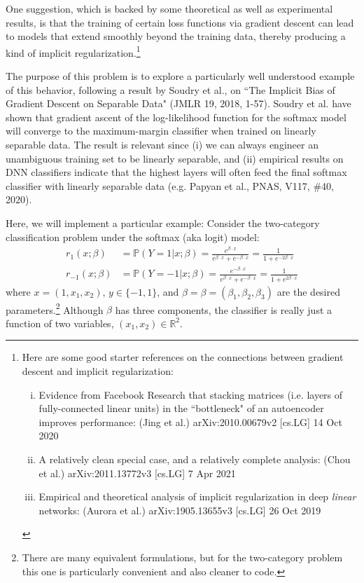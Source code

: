 \documentclass[11pt]{report}
\begin{document}
\begin{enumerate}[1.]
	      One suggestion, which is backed by some theoretical as well as experimental results, is that the training of certain loss functions via gradient descent can lead to models that extend smoothly beyond the training data, thereby producing a kind of implicit regularization.\footnote{
		      Here are some good starter references on the connections between gradient descent and implicit regularization:
		      \begin{enumerate}[(i)]
			      \item Evidence from Facebook Research that stacking matrices (i.e. layers of fully-connected linear units) in the ``bottleneck" of an autoencoder improves performance: (Jing et al.) arXiv:2010.00679v2 [cs.LG] 14 Oct 2020
			      \item A relatively clean special case, and a relatively complete analysis: (Chou et al.) arXiv:2011.13772v3 [cs.LG] 7 Apr 2021
			      \item
			            Empirical and theoretical analysis of implicit regularization in deep {\em linear} networks: (Aurora et al.) arXiv:1905.13655v3 [cs.LG]  26 Oct 2019
		      \end{enumerate}
	      }

	      The purpose of this problem is to explore a particularly well understood example of this behavior, following
	      a result by Soudry et al.,
	      on ``The Implicit Bias of Gradient Descent on Separable Data"
	      (JMLR 19, 2018, 1-57).
	      Soudry et al. have shown that gradient ascent of the log-likelihood function for the softmax model will converge to the maximum-margin classifier when trained on linearly separable data. The result is relevant since (i) we can always engineer an unambiguous training set to be linearly separable, and (ii) empirical results on DNN classifiers indicate that the highest layers will often feed the final softmax classifier with linearly separable data (e.g. Papyan et al., PNAS, V117, \#40, 2020).

	      Here, we will implement a particular example:
	      Consider the two-category classification problem  under the softmax (aka logit) model:
	      \begin{align*}
		      r_1(x;\beta)    & = \mathds{P}\left(Y=1\big|x;\beta\right) = \frac{e^{\beta\cdot x}}{e^{\beta\cdot x} + e^{-\beta\cdot x}} = \frac{1}{1+e^{-2\beta\cdot x}} \\
		      r_{-1}(x;\beta) & = \mathds{P}\left(Y=-1\big|x;\beta\right) = \frac{e^{-\beta\cdot x}}{e^{\beta\cdot x} + e^{-\beta\cdot x}}= \frac{1}{1+e^{2\beta\cdot x}}
	      \end{align*}
	      where $x = (1,x_1,x_2)$, $y\in\{-1,1\}$, and $\beta= \beta=(\beta_1,\beta_2,\beta_3)$ are the desired parameters.\footnote{There are many
		      equivalent formulations, but for the two-category problem this one is particularly convenient and also cleaner to code.}
	      Although $\beta$ has three components, the classifier is really just a function of two variables,  $(x_1,x_2)\in\mathds{R}^2$.


\end{enumerate}
\end{document}
